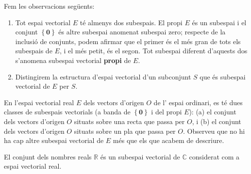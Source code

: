 \begin{observacio}
Fem les observacions següents:

\begin{enumerate}
\item Tot espai vectorial $E$ té almenys dos subespais. El
propi $E$ és un subespai i el conjunt $\left\{ \mathbf{0}%
\right\} $ és altre subespai anomenat subespai zero; respecte de la
inclusió de conjunts, podem afirmar que el primer és el més gran de
tots els subespais de $E$, i el més petit, és el segon. Tot
subespai diferent d'aquests dos s’anomena subespai vectorial \textbf{propi}
de $E$.

\item Distingirem la estructura d’espai vectorial d’un subconjunt $S$
que és subespai vectorial de $E$ per $S$.
\end{enumerate}
\end{observacio}

\begin{exemple}
En l’espai vectorial real $E$ dels vectors d'origen $O$ de l'
espai ordinari, es té dues classes de subespais vectorials (a banda
de $\left\{ \mathbf{0}\right\} $ i del propi $E$): (a) el conjunt
dels vectors d'origen $O$ situats sobre una recta que passa per $O$, i
(b) el conjunt dels vectors d'origen $O$ situats sobre un pla que
passa per $O$. Observeu que no hi ha cap altre subespai vectorial
de $E$ més que els que acabem de descriure.
\end{exemple}

\begin{exemple}
El conjunt dels nombres reals $\mathbb{R}$ és un subespai
vectorial de $\mathbb{C}$ considerat com a espai vectorial real.
\end{exemple}

